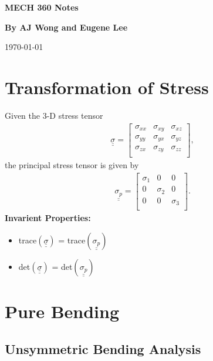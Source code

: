 \documentclass{article}
\numberwithin{equation}{subsection}
\newcommand{\mm}[9]{\begin{bmatrix}
  #1 & #2 & #3\\
  #4 & #5 &#6\\
  #7 & #8 & #9\\
\end{bmatrix}}
\newcommand{\tensor}[1]{\underline{\underline{#1}}}
\begin{document}
\begin{titlepage}
    \title{}
    \author{}
    \date{}
    \begin{center}
        \vspace*{3cm}
            
        \Huge
        \textbf{MECH 360 Notes}
            
        \vspace{1cm}
 
        \vspace{1.5cm}
        \Large
        \textbf{By AJ Wong and Eugene Lee} \\                    %
   
        \vfill
   
        \vspace{1cm}

        \Large
        \today %
    \end{center}
\end{titlepage}

\tableofcontents

\newpage

\section{Transformation of Stress}
Given the 3-D stress tensor
\begin{align}
  \tensor{\sigma} = \mm{\sigma_{xx}}{\sigma_{xy}}{\sigma_{xz}}{\sigma_{yy}}{\sigma_{yx}}{\sigma_{yz}}{\sigma_{zx}}{\sigma_{zy}}{\sigma_{zz}},
\end{align}
the principal stress tensor is given by
\begin{align}
  \tensor{\sigma_p} = \mm{\sigma_1}{0}{0}{0}{\sigma_2}{0}{0}{0}{\sigma_3}.
\end{align}
\textbf{Invarient Properties:}
\begin{itemize}
  \item trace$(\tensor{\sigma})$ = trace$(\tensor{\sigma_p})$
  \item det$(\tensor{\sigma})$ = det$(\tensor{\sigma_p})$
\end{itemize}

\section{Pure Bending}
\subsection{Unsymmetric Bending Analysis}
\end{document}
